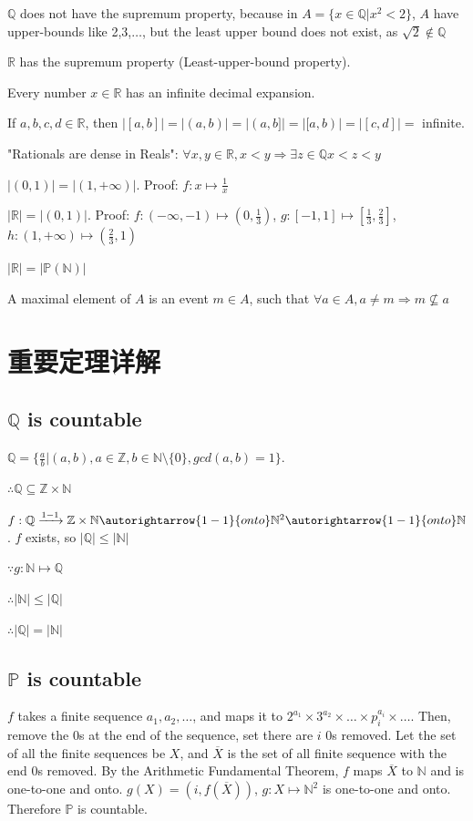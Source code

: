 \documentclass[12pt,a4paper]{ctexrep}
\begin{document}
$\mathbb{Q}$ does not have the supremum property, because in $A=\{x \in \mathbb{Q}| x^2<2\}$, $A$ have upper-bounds like 2,3,$\dots$, but the least upper bound does not exist, as $\sqrt{2} \notin \mathbb{Q}$

$\mathbb{R}$ has the supremum property (Least-upper-bound property).

Every number $x\in \mathbb{R}$ has an infinite decimal expansion.

If $a,b,c,d \in \mathbb{R}$, then $|[a,b]| = |(a,b)| = |(a,b]| = |[a,b)| = |[c,d]| = $ infinite.

"Rationals are dense in Reals": $\forall x,y \in \mathbb{R}, x<y \Rightarrow \exists z \in \mathbb{Q} x<z<y$

$|(0,1)| = |(1,+\infty)|$. Proof: $f: x \mapsto \frac{1}{x}$

$|\mathbb{R}| = |(0,1)|$. Proof: $f: (-\infty,-1)\mapsto(0,\frac{1}{3})$, $g: [-1,1]\mapsto[\frac{1}{3},\frac{2}{3}]$, $h: (1,+\infty)\mapsto(\frac{2}{3},1)$

$|\mathbb{R}| = |\mathbb{P}(\mathbb{N})|$

A maximal element of $A$ is an event $m \in A$, such that $\forall a \in A, a \neq m \Rightarrow m \nsubseteq a$

\section{重要定理详解}
\subsection{$\mathbb{Q}$ is countable} 
$\mathbb{Q} = \{\frac{a}{b}|(a,b),a \in \mathbb{Z},b\in \mathbb{N}\setminus\{0\},gcd(a,b) = 1\}$. 

$\therefore \mathbb{Q} \subseteq \mathbb{Z}\times \mathbb{N}$

$f: \mathbb{Q}\xrightarrow{1-1}\mathbb{Z}\times\mathbb{N}\autorightarrow{1-1}{onto}\mathbb{N}^2\autorightarrow{1-1}{onto}\mathbb{N}$. $f$ exists, so $|\mathbb{Q}|\leqslant|\mathbb{N}|$

$\because g:\mathbb{N}\mapsto \mathbb{Q}$

$\therefore |\mathbb{N}|\leqslant|\mathbb{Q}|$

$\therefore |\mathbb{Q}| = |\mathbb{N}|$
\subsection{$\mathbb{P}$ is countable}
$f$ takes a finite sequence $a_1,a_2,\dots$, and maps it to $2^{a_1}\times3^{a_2}\times\dots\times p_i^{a_i} \times\dots$. Then, remove the 0s at the end of the sequence, set there are $i$ 0s removed. Let the set of all the finite sequences be $X$, and $\overline{X}$ is the set of all finite sequence with the end 0s removed. By the Arithmetic Fundamental Theorem, $f$ maps $\overline{X}$ to $\mathbb{N}$ and is one-to-one and onto. $g(X) = (i,f(\overline{X}))$, $g:X \mapsto \mathbb{N}^2$ is one-to-one and onto. Therefore $\mathbb{P}$ is countable.
\end{document}
